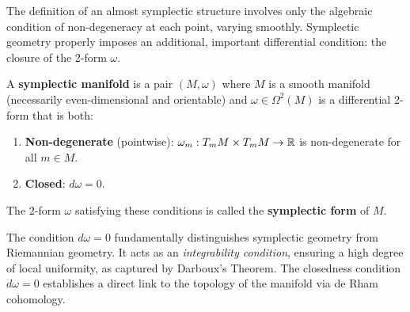 The definition of an almost symplectic structure involves only the algebraic condition of non-degeneracy at each point, varying smoothly. Symplectic geometry properly imposes an additional, important differential condition: the closure of the 2-form $\omega$.

\begin{definition}
A \textbf{symplectic manifold} is a pair $(M, \omega)$ where $M$ is a smooth manifold (necessarily even-dimensional and orientable) and $\omega \in \Omega^{2}(M)$ is a differential 2-form that is both:
\begin{enumerate}
    \item \textbf{Non-degenerate} (pointwise): $\omega_m: T_m M \times T_m M \to \mathbb{R}$ is non-degenerate for all $m \in M$.
    \item \textbf{Closed}: $d\omega = 0$.
\end{enumerate}
The 2-form $\omega$ satisfying these conditions is called the \textbf{symplectic form} of $M$.
\end{definition}

The condition $d \omega = 0$ fundamentally distinguishes symplectic geometry from Riemannian geometry. It acts as an \emph{integrability condition}, ensuring a high degree of local uniformity, as captured by Darboux's Theorem. The closedness condition $d\omega=0$ establishes a direct link to the topology of the manifold via de Rham cohomology.

